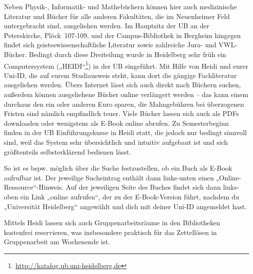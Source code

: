 Neben Physik-, Informatik- und Mathebüchern können hier auch medizinische Literatur und Bücher für alle anderen Fakultäten, die im Neuenheimer Feld untergebracht sind, ausgeliehen werden. Im Hauptsitz der \gls{UB} an der Peterskirche, Plöck~107-109, und der Campus-Bibliothek in Bergheim hingegen findet sich geisteswissenschaftliche Literatur sowie zahlreiche Jura- und VWL- Bücher. Bedingt durch diese Dreiteilung wurde in Heidelberg sehr früh ein Computersystem („\gls{HEIDI}“\footnote{\url{http://katalog.ub.uni-heidelberg.de}}) in der UB eingeführt. Mit Hilfe von Heidi und eurer Uni-ID, die auf eurem Studiausweis steht, kann dort die gängige Fachliteratur ausgeliehen werden. Übers Internet lässt sich auch direkt nach Büchern suchen, außerdem können ausgeliehene Bücher online verlängert werden -- das kann einem durchaus den ein oder anderen Euro sparen, die Mahngebühren bei überzogenen Fristen sind nämlich empfindlich teuer. Viele Bücher lassen sich auch als PDFs downloaden oder wenigstens als E-Book online abrufen. Zu Semesterbeginn finden in der UB Einführungskurse in Heidi statt, die jedoch nur bedingt sinnvoll sind, weil das System sehr übersichtlich und intuitiv aufgebaut ist und sich größtenteils selbsterklärend bedienen lässt.

So ist es bspw. möglich über die Suche festzustellen, ob ein Buch als E-Book aufrufbar ist. Der jeweilige Sucheintrag enthält dann links-unten einen „Online-Ressource“-Hinweis. Auf der jeweiligen Seite des Buches findet sich dann links-oben ein Link „online aufrufen“, der zu der E-Book-Version führt, nachdem du „Universität Heidelberg“ angewählt und dich mit deiner Uni-ID angemeldet hast. 

Mittels Heidi lassen sich auch Gruppenarbeitsräume in den Bibliotheken kostenfrei reservieren, was insbesondere praktisch für das Zettellösen in Gruppenarbeit am Wochenende ist.

